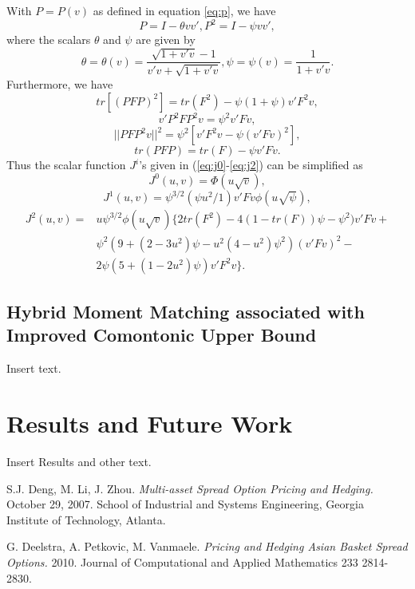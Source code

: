 \documentclass[a4paper]{article}
\begin{document}
\begin{prop}
\label{prop:app2short}
With $P = P(v)$ as defined in equation \ref{eq:p}, we have
$$P=I-\theta vv', P^2=I-\psi vv',$$
where the scalars $\theta$ and $\psi$ are given by
$$\theta=\theta(v)=\frac{\sqrt{1+v'v}-1}{v'v+\sqrt{1+v'v}},\psi=\psi(v)=\frac{1}{1+v'v}.$$
Furthermore, we have
$$tr[(PFP)^2]=tr(F^2)-\psi(1+\psi)v'F^2v,$$
$$v'P^2FP^2v=\psi^2v'Fv,$$
$$||PFP^2v||^2=\psi^2[v'F^2v-\psi(v'Fv)^2],$$
$$tr(PFP)=tr(F)-\psi v'Fv.$$
Thus the scalar function $J^i$'s given in (\ref{eq:j0}-\ref{eq:j2}) can be simplified as
\begin{equation}
J^0(u,v)=\Phi(u\sqrt{v}),
\end{equation}
\begin{equation}
J^1(u,v)=\psi^{3/2}(\psi u^2/1)v'Fv\phi(u\sqrt{\psi}),
\end{equation}
\begin{equation}
\begin{split}
J^2(u,v)=&u\psi^{3/2}\phi(u\sqrt{v})\big\{2tr(F^2) - 4(1-tr(F))\psi-\psi^2)v'Fv+ \\
	& \psi^2(9+(2-3u^2)\psi-u^2(4-u^2)\psi^2)(v'Fv)^2-\\
	&2\psi(5+(1-2u^2)\psi)v'F^2v\big\}.
\end{split}
\end{equation}
\end{prop}


\subsection{Hybrid Moment Matching associated with Improved Comontonic Upper Bound}
\label{sec:hybmmicup}
Insert text.

\newpage
\section{Results and Future Work}
\label{sec:results}
Insert Results and other text.

\newpage
\begin{thebibliography}{1}
S.J. Deng, M. Li, J. Zhou.
\textit{Multi-asset Spread Option Pricing and Hedging.}
October 29, 2007. School of Industrial and Systems Engineering, Georgia Institute of Technology, Atlanta.

G. Deelstra, A. Petkovic, M. Vanmaele.
\textit{Pricing and Hedging Asian Basket Spread Options.}
2010. Journal of Computational and Applied Mathematics 233 2814-2830.

\end{thebibliography}
\end{document}
